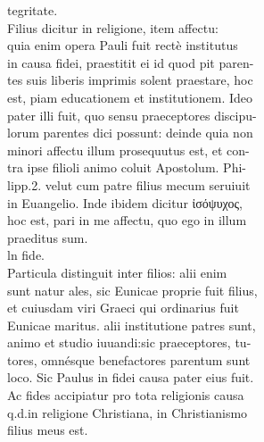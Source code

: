 \documentclass{article}
\begin{document}
\begin{pages}
                tegritate. \\
                Filius dicitur in religione, item affectu: \\
                quia enim opera Pauli fuit rectè institutus \\
                in causa fidei, praestitit ei id quod pit paren- \\
                tes suis liberis imprimis solent praestare, hoc \\
                est, piam educationem et institutionem. Ideo \\
                pater illi fuit, quo sensu praeceptores discipu- \\
                lorum parentes dici possunt: deinde quia non \\
                minori affectu illum prosequutus est, et con- \\
                tra ipse filioli animo coluit Apostolum. Phi- \\
                lipp.2. velut cum patre filius mecum seruiuit \\
                in Euangelio. Inde ibidem dicitur ἰσόψυχος, \\
                hoc est, pari in me affectu, quo ego in illum \\
                praeditus sum. \\
                ln fide. \\
                Particula distinguit inter filios: alii enim \\
                sunt natur ales, sic Eunicae proprie fuit filius, \\
                et cuiusdam viri Graeci qui ordinarius fuit \\
                Eunicae maritus. alii institutione patres sunt, \\
                animo et studio iuuandi:sic praeceptores, tu- \\
                tores, omnésque benefactores parentum sunt \\
                loco. Sic Paulus in fidei causa pater eius fuit. \\
                Ac fides accipiatur pro tota religionis causa \\
                q.d.in religione Christiana, in Christianismo \\
                filius meus est. \\

\end{pages}
\end{document}

